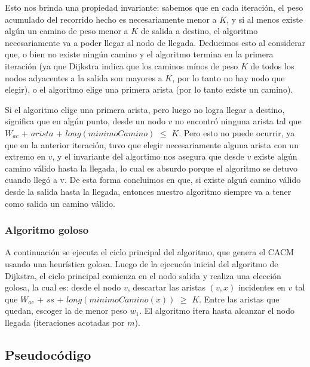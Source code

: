 Esto nos brinda una propiedad invariante: sabemos que en cada iteraci\'on, el peso acumulado del recorrido hecho es necesariamente menor a $K$, y si al menos existe alg\'un un camino de peso menor a $K$ de salida a destino, el algoritmo necesariamente va a poder llegar al nodo de llegada. Deducimos esto al considerar que, o bien no existe ning\'un camino y  el algoritmo termina en la primera iteraci\'on (ya que Dijkstra indica que los caminos m\'inos de peso $K$ de todos los nodos adyacentes a la salida son mayores a $K$, por lo tanto no hay nodo que elegir), o el algoritmo elige una primera arista (por lo tanto existe un camino). 

\vspace{2mm}

Si el algoritmo elige una primera arista, pero luego no logra llegar a destino, significa que en alg\'un punto, desde un nodo $v$ no encontr\'o ninguna arista tal que $W_{ac}$ + $arista$ + $long(minimoCamino)$ $\leq$ $K$. Pero esto no puede ocurrir, ya que en la anterior iteraci\'on, tuvo que elegir necesariamente alguna arista con un extremo en $v$, y el invariante del algortimo nos asegura que desde $v$ existe alg\'un camino v\'alido hasta la llegada, lo cual es absurdo porque el algoritmo se detuvo cuando lleg\'o a v. De esta forma concluimos en que, si existe algu\'n camino v\'alido desde la salida hasta la llegada, entonces nuestro algoritmo siempre va a tener como salida un camino v\'alido.

\subsubsection{Algoritmo goloso}

A continuaci\'on se ejecuta el ciclo principal del algoritmo, que genera el CACM usando una heur\'istica golosa. Luego de la ejecuc\'on inicial del algoritmo de Dijkstra, el ciclo principal comienza en el nodo salida y realiza una elecci\'on golosa, la cual es: desde el nodo $v$, descartar las aristas $(v,x)$ incidentes en $v$ tal que $W_{ac}$ + $ss$ + $long(minimoCamino(x))$ $\geq$ $K$. Entre las aristas que quedan, escoger la de menor peso $w_1$. El algoritmo itera hasta alcanzar el nodo llegada (iteraciones acotadas por $m$).

\subsection{Pseudoc\'odigo}



